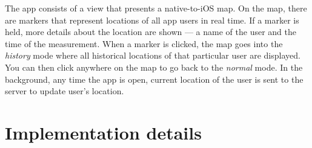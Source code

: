 The app consists of a view that presents a native-to-iOS map. On the map, there are markers that represent locations of all app users in real time. If a marker is held, more details about the location are shown --- a name of the user and the time of the measurement. When a marker is clicked, the map goes into the \textit{history} mode where all historical locations of that particular user are displayed. You can then click anywhere on the map to go back to the \textit{normal} mode. In the background, any time the app is open, current location of the user is sent to the server to update user's location.

\section{Implementation details}
